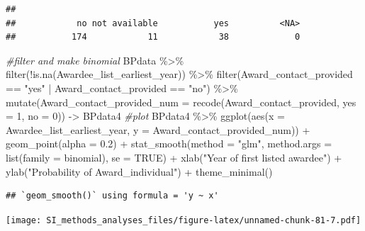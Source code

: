 \documentclass[
]{article}
\newenvironment{Shaded}{\begin{snugshade}}{\end{snugshade}}
\newcommand{\AttributeTok}[1]{\textcolor[rgb]{0.77,0.63,0.00}{#1}}
\newcommand{\CommentTok}[1]{\textcolor[rgb]{0.56,0.35,0.01}{\textit{#1}}}
\newcommand{\ConstantTok}[1]{\textcolor[rgb]{0.00,0.00,0.00}{#1}}
\newcommand{\DecValTok}[1]{\textcolor[rgb]{0.00,0.00,0.81}{#1}}
\newcommand{\FloatTok}[1]{\textcolor[rgb]{0.00,0.00,0.81}{#1}}
\newcommand{\FunctionTok}[1]{\textcolor[rgb]{0.00,0.00,0.00}{#1}}
\newcommand{\NormalTok}[1]{#1}
\newcommand{\OtherTok}[1]{\textcolor[rgb]{0.56,0.35,0.01}{#1}}
\newcommand{\SpecialCharTok}[1]{\textcolor[rgb]{0.00,0.00,0.00}{#1}}
\newcommand{\StringTok}[1]{\textcolor[rgb]{0.31,0.60,0.02}{#1}}
\begin{document}
\begin{verbatim}
## 
##            no not available           yes          <NA> 
##           174            11            38             0
\end{verbatim}

\begin{Shaded}
\begin{Highlighting}[]
\CommentTok{\#filter and make binomial }
\NormalTok{BPdata }\SpecialCharTok{\%\textgreater{}\%} 
  \FunctionTok{filter}\NormalTok{(}\SpecialCharTok{!}\FunctionTok{is.na}\NormalTok{(Awardee\_list\_earliest\_year)) }\SpecialCharTok{\%\textgreater{}\%} 
  \FunctionTok{filter}\NormalTok{(Award\_contact\_provided }\SpecialCharTok{==} \StringTok{"yes"} \SpecialCharTok{|}\NormalTok{ Award\_contact\_provided }\SpecialCharTok{==} \StringTok{"no"}\NormalTok{) }\SpecialCharTok{\%\textgreater{}\%}  
  \FunctionTok{mutate}\NormalTok{(}\AttributeTok{Award\_contact\_provided\_num =} \FunctionTok{recode}\NormalTok{(Award\_contact\_provided, }\AttributeTok{yes =} \DecValTok{1}\NormalTok{, }\AttributeTok{no =} \DecValTok{0}\NormalTok{)) }\OtherTok{{-}\textgreater{}}\NormalTok{ BPdata4}
\CommentTok{\#plot}
\NormalTok{BPdata4  }\SpecialCharTok{\%\textgreater{}\%} 
  \FunctionTok{ggplot}\NormalTok{(}\FunctionTok{aes}\NormalTok{(}\AttributeTok{x =}\NormalTok{ Awardee\_list\_earliest\_year, }\AttributeTok{y =}\NormalTok{ Award\_contact\_provided\_num)) }\SpecialCharTok{+} 
  \FunctionTok{geom\_point}\NormalTok{(}\AttributeTok{alpha =} \FloatTok{0.2}\NormalTok{) }\SpecialCharTok{+} 
  \FunctionTok{stat\_smooth}\NormalTok{(}\AttributeTok{method =} \StringTok{"glm"}\NormalTok{, }\AttributeTok{method.args =} \FunctionTok{list}\NormalTok{(}\AttributeTok{family =}\NormalTok{ binomial), }\AttributeTok{se =} \ConstantTok{TRUE}\NormalTok{) }\SpecialCharTok{+}
  \FunctionTok{xlab}\NormalTok{(}\StringTok{"Year of first listed awardee"}\NormalTok{) }\SpecialCharTok{+} 
  \FunctionTok{ylab}\NormalTok{(}\StringTok{"Probability of Award\_individual"}\NormalTok{) }\SpecialCharTok{+}
  \FunctionTok{theme\_minimal}\NormalTok{()}
\end{Highlighting}
\end{Shaded}

\begin{verbatim}
## `geom_smooth()` using formula = 'y ~ x'
\end{verbatim}

\texttt{[image: SI\_methods\_analyses\_files/figure-latex/unnamed-chunk-81-7.pdf]}
\end{document}
